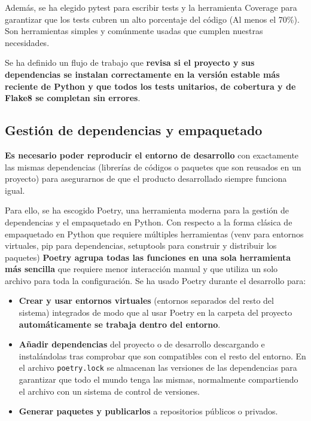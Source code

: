 Además, se ha elegido pytest para escribir tests y la herramienta Coverage para garantizar que los tests cubren un alto porcentaje del código (Al menos el 70\%). Son herramientas simples y comúnmente usadas que cumplen nuestras necesidades.

Se ha definido un flujo de trabajo que \textbf{revisa si el proyecto y sus dependencias se instalan correctamente en la versión estable más reciente de Python y que todos los tests unitarios, de cobertura y de Flake8 se completan sin errores}.

\subsection{Gestión de dependencias y empaquetado}

\textbf{Es necesario poder reproducir el entorno de desarrollo} con exactamente las mismas dependencias
(librerías de códigos o paquetes que son reusados en un proyecto) para asegurarnos de que el producto desarrollado siempre funciona igual.

Para ello, se ha escogido Poetry, una herramienta moderna para la gestión de dependencias y el empaquetado en Python. Con respecto a la forma clásica de empaquetado en Python que requiere múltiples herramientas (venv para entornos virtuales, pip para dependencias, setuptools para construir y distribuir los paquetes) \textbf{Poetry agrupa todas las funciones en una sola herramienta más sencilla} que requiere menor interacción manual y que utiliza un solo archivo para toda la configuración. Se ha usado Poetry durante el desarrollo para:

\begin{itemize}
	\item{\textbf{Crear y usar entornos virtuales} (entornos separados del resto del sistema) integrados de modo que al usar Poetry en la carpeta del proyecto \textbf{automáticamente se trabaja dentro del entorno}.}
	\item{\textbf{Añadir dependencias} del proyecto o de desarrollo descargando e instalándolas tras comprobar que son compatibles con el resto del entorno. En el archivo \texttt{poetry.lock} se almacenan las versiones de las dependencias para garantizar que todo el mundo tenga las mismas, normalmente compartiendo el archivo con un sistema de control de versiones.}
	\item{\textbf{Generar paquetes y publicarlos} a repositorios públicos o privados.}
\end{itemize}

